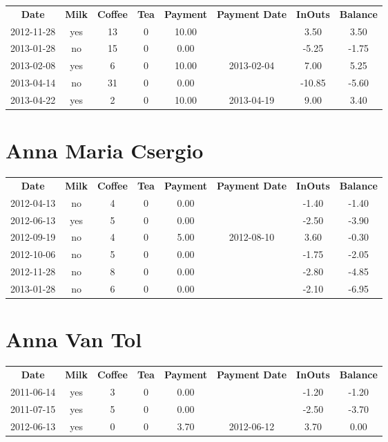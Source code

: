 \begin{center}
\begin{tabular}{cccccccc}
\textbf{Date} & \textbf{Milk} & \textbf{Coffee} & \textbf{Tea} & \textbf{Payment} & \textbf{Payment Date} & \textbf{InOuts} & \textbf{Balance} \\
2012-11-28 & yes & 13 & 0 & 10.00 &  &   3.50 &  3.50\\ 
2013-01-28 & no & 15 & 0 &  0.00 &  &  -5.25 & -1.75\\ 
2013-02-08 & yes &  6 & 0 & 10.00 & 2013-02-04 &   7.00 &  5.25\\ 
2013-04-14 & no & 31 & 0 &  0.00 &  & -10.85 & -5.60\\ 
2013-04-22 & yes &  2 & 0 & 10.00 & 2013-04-19 &   9.00 &  3.40
\end{tabular}
\end{center}

\section{Anna Maria Csergio}

\begin{center}
\begin{tabular}{cccccccc}
\textbf{Date} & \textbf{Milk} & \textbf{Coffee} & \textbf{Tea} & \textbf{Payment} & \textbf{Payment Date} & \textbf{InOuts} & \textbf{Balance} \\
2012-04-13 & no & 4 & 0 & 0.00 &  & -1.40 & -1.40\\ 
2012-06-13 & yes & 5 & 0 & 0.00 &  & -2.50 & -3.90\\ 
2012-09-19 & no & 4 & 0 & 5.00 & 2012-08-10 &  3.60 & -0.30\\ 
2012-10-06 & no & 5 & 0 & 0.00 &  & -1.75 & -2.05\\ 
2012-11-28 & no & 8 & 0 & 0.00 &  & -2.80 & -4.85\\ 
2013-01-28 & no & 6 & 0 & 0.00 &  & -2.10 & -6.95
\end{tabular}
\end{center}

\section{Anna Van Tol}

\begin{center}
\begin{tabular}{cccccccc}
\textbf{Date} & \textbf{Milk} & \textbf{Coffee} & \textbf{Tea} & \textbf{Payment} & \textbf{Payment Date} & \textbf{InOuts} & \textbf{Balance} \\
2011-06-14 & yes & 3 & 0 & 0.00 &  & -1.20 & -1.20\\ 
2011-07-15 & yes & 5 & 0 & 0.00 &  & -2.50 & -3.70\\ 
2012-06-13 & yes & 0 & 0 & 3.70 & 2012-06-12 &  3.70 &  0.00
\end{tabular}
\end{center}

